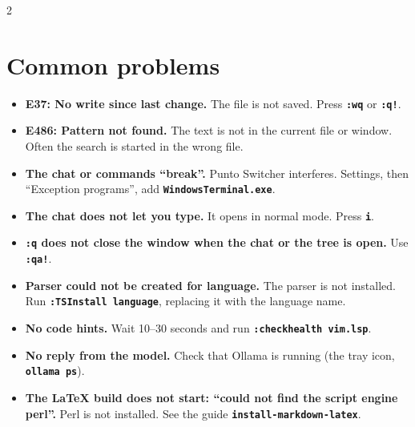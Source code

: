 \documentclass[10pt]{article}
\newcommand{\key}[1]{\texttt{\bfseries #1}}
\begin{document}
\begin{paracol}{2}
\section*{Common problems}
\begin{itemize}\setlength\itemsep{2pt}
\item \textbf{E37: No write since last change.} The file is not saved. Press \key{:wq} or \key{:q!}.
\item \textbf{E486: Pattern not found.} The text is not in the current file or window. Often the search is started in the wrong file.
\item \textbf{The chat or commands ``break''.} Punto Switcher interferes. Settings, then ``Exception programs'', add \key{WindowsTerminal.exe}.
\item \textbf{The chat does not let you type.} It opens in normal mode. Press \key{i}.
\item \textbf{\key{:q} does not close the window when the chat or the tree is open.} Use \key{:qa!}.
\item \textbf{Parser could not be created for language.} The parser is not installed. Run \key{:TSInstall language}, replacing it with the language name.
\item \textbf{No code hints.} Wait 10--30 seconds and run \key{:checkhealth vim.lsp}.
\item \textbf{No reply from the model.} Check that Ollama is running (the tray icon, \key{ollama ps}).
\item \textbf{The LaTeX build does not start: ``could not find the script engine perl''.} Perl is not installed. See the guide \key{install-markdown-latex}.
\end{itemize}
\end{paracol}
\end{document}
